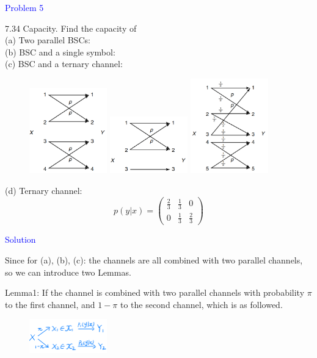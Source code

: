 \textcolor{blue}{Problem 5}

7.34 Capacity. Find the capacity of \\
(a) Two parallel BSCs: \\
(b) BSC and a single symbol: \\
(c) BSC and a ternary channel:
\begin{figure}[htbp]
    \centering
	\includegraphics[width=0.3\textwidth]{../figures/7.34_a.png}
	\includegraphics[width=0.3\textwidth]{../figures/7.34_b.png}
	\includegraphics[width=0.3\textwidth]{../figures/7.34_c.png}
\end{figure}

(d) Ternary channel:
$$
p(y|x)=\left(\begin{array}{lll}
\frac{2}{3} & \frac{1}{3} & 0 \\
0 & \frac{1}{3} & \frac{2}{3}
\end{array}\right)
$$

\textcolor{blue}{Solution}

Since for (a), (b), (c): the channels are all combined with two parallel channels, so we can introduce two Lemmas.


Lemma1: If the channel is combined with two parallel channels with probability $\pi$ to the first channel, and $1-\pi$ to the second channel, which is as followed.
\begin{figure}[htbp]
    \centering
	\includegraphics[width=0.3\textwidth]{../figures/parallel.png}
\end{figure}

